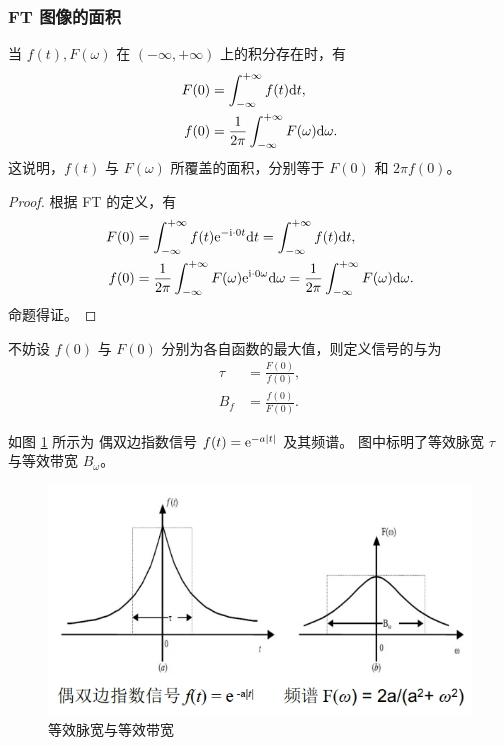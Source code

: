 \subsubsection{FT 图像的面积}

\begin{property}
    当 $f(t), F(\omega)$ 在 $(-\infty, +\infty)$ 上的积分存在时，有
    \begin{align*}
        F(0) & = \int_{-\infty}^{+\infty} f(t)\mathrm{d}t, \\
        f(0) & = \frac{1}{2\pi}\int_{-\infty}^{+\infty} F(\omega)\mathrm{d}\omega.
    \end{align*}
    这说明，$f(t)$ 与 $F(\omega)$ 所覆盖的面积，分别等于 $F(0)$ 和 $2\pi f(0)$。
\end{property}

\begin{proof}
    根据 FT 的定义，有
    \begin{align*}
        F(0) & = \int_{-\infty}^{+\infty} f(t)\mathrm{e}^{-\mathrm{i}\cdot 0 t}\mathrm{d}t = \int_{-\infty}^{+\infty} f(t)\mathrm{d}t, \\
        f(0) & = \frac{1}{2\pi}\int_{-\infty}^{+\infty} F(\omega)\mathrm{e}^{\mathrm{i}\cdot 0 \omega}\mathrm{d}\omega = \frac{1}{2\pi}\int_{-\infty}^{+\infty} F(\omega)\mathrm{d}\omega.
    \end{align*}
    命题得证。
\end{proof}

\begin{definition}[等效脉宽与等效带宽]
    不妨设 $f(0)$ 与 $F(0)$ 分别为各自函数的最大值，则定义信号的与为
    \begin{align*}
        \tau & = \frac{F(0)}{f(0)}, \\
        B_f & = \frac{f(0)}{F(0)}.
    \end{align*}
\end{definition}

\begin{example}
    如图 \ref{fig:equivalent-bandwidth-and-pulse-width} 所示为
    偶双边指数信号 $f(t) = \mathrm{e}^{-a|t|}$ 及其频谱。
    图中标明了等效脉宽 $\tau$ 与等效带宽 $B_\omega$。
    \begin{figure}[H]
        \centering
        \includegraphics[width = 0.6\linewidth]{chap2/img/equivalent-bandwidth-and-pulse-width.png}
        \caption{等效脉宽与等效带宽}
        \label{fig:equivalent-bandwidth-and-pulse-width}
    \end{figure}
\end{example}

